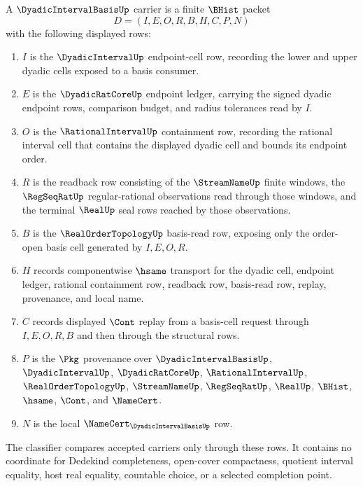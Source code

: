 \begin{definition}
\label{def:dyadic-interval-basis-carrier}
A $\DyadicIntervalBasisUp$ carrier is a finite $\BHist$ packet
$$
D=(I,E,O,R,B,H,C,P,N)
$$
with the following displayed rows:
\begin{enumerate}
\item $I$ is the $\DyadicIntervalUp$ endpoint-cell row, recording the lower and upper dyadic cells exposed to a basis consumer.
\item $E$ is the $\DyadicRatCoreUp$ endpoint ledger, carrying the signed dyadic endpoint rows, comparison budget, and radius tolerances read by $I$.
\item $O$ is the $\RationalIntervalUp$ containment row, recording the rational interval cell that contains the displayed dyadic cell and bounds its endpoint order.
\item $R$ is the readback row consisting of the $\StreamNameUp$ finite windows, the $\RegSeqRatUp$ regular-rational observations read through those windows, and the terminal $\RealUp$ seal rows reached by those observations.
\item $B$ is the $\RealOrderTopologyUp$ basis-read row, exposing only the order-open basis cell generated by $I,E,O,R$.
\item $H$ records componentwise $\hsame$ transport for the dyadic cell, endpoint ledger, rational containment row, readback row, basis-read row, replay, provenance, and local name.
\item $C$ records displayed $\Cont$ replay from a basis-cell request through $I,E,O,R,B$ and then through the structural rows.
\item $P$ is the $\Pkg$ provenance over $\DyadicIntervalBasisUp$, $\DyadicIntervalUp$, $\DyadicRatCoreUp$, $\RationalIntervalUp$, $\RealOrderTopologyUp$, $\StreamNameUp$, $\RegSeqRatUp$, $\RealUp$, $\BHist$, $\hsame$, $\Cont$, and $\NameCert$.
\item $N$ is the local $\NameCert_{\DyadicIntervalBasisUp}$ row.
\end{enumerate}
The classifier compares accepted carriers only through these rows. It contains no coordinate for Dedekind completeness, open-cover compactness, quotient interval equality, host real equality, countable choice, or a selected completion point.
\end{definition}


